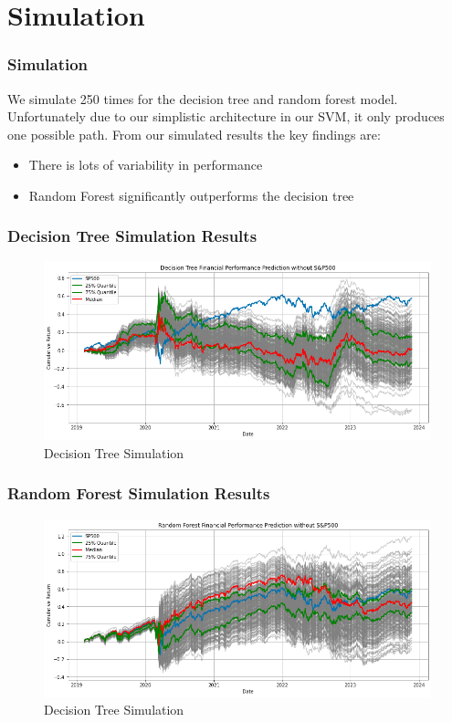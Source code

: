 \documentclass{beamer}
\begin{document}
\section{Simulation}
\begin{frame}
\frametitle{Simulation}
We simulate 250 times for the decision tree and random forest model. Unfortunately due to our simplistic architecture in our SVM, it only produces one possible path. From our simulated results the key findings are:
\newline
\begin{itemize}
    \item There is lots of variability in performance
    \item Random Forest significantly outperforms the decision tree
\end{itemize}
\end{frame}

\begin{frame}
\frametitle{Decision Tree Simulation Results}
\begin{figure}[h!]
  \includegraphics[width=0.9\columnwidth]{images/dt_sim.png}
  \caption{Decision Tree Simulation}
  \label{fig: Decision Tree Simulation}
\end{figure}
\end{frame}

\begin{frame}
\frametitle{Random Forest Simulation Results}
\begin{figure}[h!]
\begin{center}
  \includegraphics[width=0.9\columnwidth]{images/rf_sim.png}
  \caption{Decision Tree Simulation}
\end{center}
  \label{fig: Random Forest Simulation}
\end{figure}

\end{frame}
\end{document}
